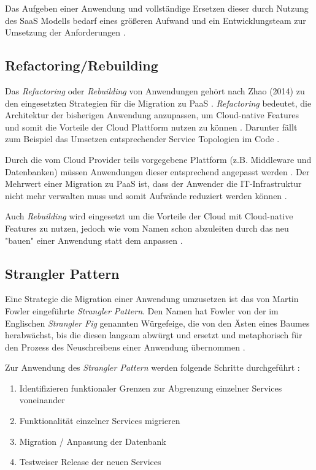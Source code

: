Das Aufgeben einer Anwendung und vollständige Ersetzen dieser durch Nutzung des \ac{SaaS} Modells bedarf eines größeren Aufwand und ein Entwicklungsteam zur Umsetzung der Anforderungen \cite[Vgl.][]{CIO}. \pagebreak

\subsection{Refactoring/Rebuilding}
Das \textit{Refactoring} oder \textit{Rebuilding} von Anwendungen gehört nach Zhao (2014) zu den eingesetzten Strategien für die Migration zu \ac{PaaS} \cite[Vgl.][S. 144]{Zhao2014}. \textit{Refactoring} bedeutet, die Architektur der bisherigen Anwendung anzupassen, um Cloud-native Features \cite[Vgl.][S. 2]{Ahmad2018} und somit die Vorteile der Cloud Plattform nutzen zu können \cite[Vgl.][]{CIO}. Darunter fällt zum Beispiel das Umsetzen entsprechender Service Topologien im Code \cite[Vgl.][S. 2]{Holmes2018}.

Durch die vom Cloud Provider teils vorgegebene Plattform (z.B. Middleware und Datenbanken) müssen Anwendungen dieser entsprechend angepasst werden \cite[Vgl.][S. 227]{Surianarayanan2019}. Der Mehrwert einer Migration zu \ac{PaaS} ist, dass der Anwender die IT-Infrastruktur nicht mehr verwalten muss und somit Aufwände reduziert werden können \cite[Vgl.][S. 6]{Pahl}.

Auch \textit{Rebuilding} wird eingesetzt um die Vorteile der Cloud mit Cloud-native Features zu nutzen, jedoch wie vom Namen schon abzuleiten durch das neu "bauen" einer Anwendung statt dem anpassen \cite[Vgl.][S. 2]{Ahmad2018}.

\subsection{Strangler Pattern}
Eine Strategie die Migration einer Anwendung umzusetzen ist das von Martin Fowler eingeführte \textit{Strangler Pattern}. Den Namen hat Fowler von der im Englischen \textit{Strangler Fig} genannten Würgefeige, die von den Ästen eines Baumes herabwächst, bis die diesen langsam abwürgt und ersetzt und metaphorisch für den Prozess des Neuschreibens einer Anwendung übernommen \cite[Vgl.][]{Fowler2004}\cite[Vgl.][]{Ibryam2021}.

Zur Anwendung des \textit{Strangler Pattern} werden folgende Schritte durchgeführt \cite[Vgl. auch im Folgenden][]{Ibryam2021}:

\begin{enumerate}
    \item Identifizieren funktionaler Grenzen zur Abgrenzung einzelner Services voneinander
    \item Funktionalität einzelner Services migrieren
    \item Migration / Anpassung der Datenbank
    \item Testweiser Release der neuen Services
\end{enumerate}

